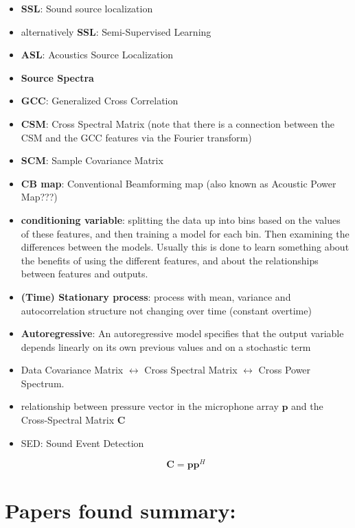 \documentclass{article}
\begin{document}
\begin{itemize}
    \item \textbf{SSL}: Sound source localization
    \item alternatively \textbf{SSL}: Semi-Supervised Learning
    \item \textbf{ASL}: Acoustics Source Localization    
    \item \textbf{Source Spectra}
    \item \textbf{GCC}: Generalized Cross Correlation
    \item \textbf{CSM}: Cross Spectral Matrix (note that there is a connection between the CSM and the GCC features via the Fourier transform)
    \item \textbf{SCM}: Sample Covariance Matrix
    \item \textbf{CB map}: Conventional Beamforming map (also known as Acoustic Power Map???)
    \item \textbf{conditioning variable}: splitting the data up into bins based on the values of these features, and then training a model for each bin. Then examining the differences between the models. Usually this is done to learn something about the benefits of using the different features, and about the relationships between features and outputs.
    \item \textbf{(Time) Stationary process}: process with mean, variance and autocorrelation structure not changing over time (constant overtime)
    \item \textbf{Autoregressive}: An autoregressive model specifies that the output variable depends linearly on its own previous values and on a stochastic term 
    \item Data Covariance Matrix $\leftrightarrow$ Cross Spectral Matrix $\leftrightarrow$ Cross Power Spectrum.
    \item relationship between pressure vector in the microphone array $\mathbf{p}$ and the Cross-Spectral Matrix $\mathbf{C}$
    \item SED: Sound Event Detection
    
    \begin{equation}
        \mathbf{C} = \mathbf{p} \mathbf{p}^H 
    \end{equation}
\end{itemize}

\section{Papers found summary:}
\end{document}
